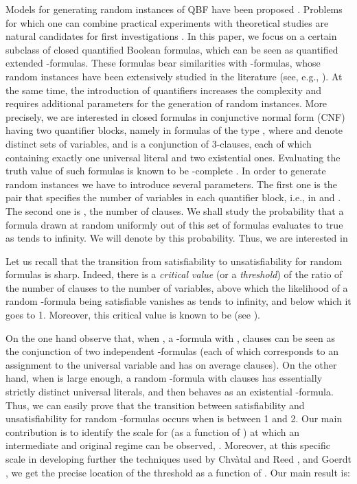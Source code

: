\documentclass[aop,noinfoline]{imsart}
\begin{document}
 Models for
generating random instances of QBF have been proposed \cite{GentW-99,ChenI-05}.
Problems for which one can combine practical experiments with
 theoretical studies are natural candidates for first investigations
 \cite{CreignouDE-07}. In this paper, we focus on a certain subclass
 of closed quantified Boolean formulas, which can be seen as
 quantified extended -formulas. These formulas bear
 similarities with -formulas, whose random instances have
 been extensively studied in the literature (see, e.g.,
 \cite{ChvatalR-92, Goerdt-96, Verhoeven-99, Bollobasetal01,
   Vega-01}). At the same time, the introduction of quantifiers
 increases the complexity and requires additional parameters for the
 generation of random instances.  More precisely, we are interested in
 closed formulas in conjunctive normal form (CNF) having two quantifier
 blocks, namely in formulas of the type , where  and  denote distinct sets of variables,
 and  is a conjunction of 3-clauses, each of which
 containing exactly one universal literal and two existential
 ones. Evaluating the truth value of such formulas is known to be
 -complete \cite{FloegelKKB-90}. In order to generate random
 instances we have to introduce several parameters.  The first one is
 the pair  that specifies the number of variables in each
 quantifier block, i.e., in  and .  The second one is , the number of clauses. We shall study the
 probability that a formula drawn at random uniformly out of this set
 of formulas evaluates to true as  tends to infinity. We will
 denote by  this probability. Thus, we are interested in


Let us recall that the transition from satisfiability to
unsatisfiability for random  formulas is sharp. Indeed, there
is a \emph{ critical value} (or a \emph{threshold}\/) of the ratio of
the number of clauses to the number of variables, above which the
likelihood of a random -formula being satisfiable vanishes as
 tends to infinity, and below which it goes to 1. Moreover, this
critical value is known to be  (see \cite{ChvatalR-92, Goerdt-96}).

On the one hand observe that, when , a -formula
with , clauses can   be seen as the conjunction of 
two independent -formulas (each of which corresponds to an
assignment to the universal variable  and has on average 
clauses).  On the other hand,   when  is large enough, a random
-formula with   clauses has
essentially strictly distinct universal literals, and then behaves
as an existential -formula. Thus,  we can easily prove
that the transition between satisfiability and unsatisfiability
for  random  -formulas occurs when  is  between 1
and 2.  Our main contribution is to identify the scale for  (as
a function of ) at which an  intermediate and original regime
can be observed, . Moreover,  at
this specific scale in developing further the techniques used by
Chv\`atal and Reed  \cite{ChvatalR-92}, and Goerdt
\cite{Goerdt-96},  we get the precise location of the threshold as
a function of .  Our main result is:
\end{document}
